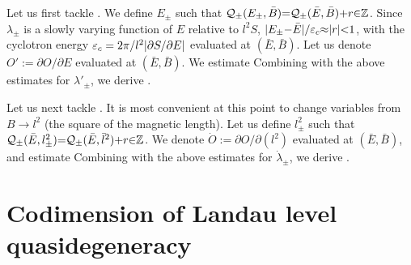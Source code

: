 \documentclass[aps, showpacs, twocolumn, notitlepage, superscriptaddress]{revtex4-1}
\begin{document}
Let us first tackle . We define $E_{\pm}$ such that ${\cal Q}_{\pm}(E_{\pm},\bar{B}){=}{\cal Q}_{\pm}(\bar{E},\bar{B}){+}r{\in} \mathbb{Z}$. Since  $\lambda_{\pm}$ is a slowly varying function of $E$ relative to $l^2S$, $|E_{\pm}{-}\bar{E}|/\varepsilon_c{\approx} |r|{<}1$, with the cyclotron energy $\varepsilon_c=2\pi/l^2|\partial S/\partial E|$ evaluated at $(\bar{E},\bar{B})$. Let us denote $O':=\partial O/\partial E$ evaluated at $(\bar{E},\bar{B})$. We estimate
Combining  with the above estimates for $\lambda'_{\pm}$, we derive .  

Let us next tackle . It is most convenient at this point to change variables from $B\rightarrow l^2$ (the square of the magnetic length). Let us  define   $l^2_{\pm}$ such that ${\cal Q}_{\pm}(\bar{E},l^2_{\pm}){=}{\cal Q}_{\pm}(\bar{E},\bar{l}^2){+}r{\in} \mathbb{Z}$. We denote  $\dot{O}:=\partial O/\partial(l^2)$ evaluated at $(\bar{E},\bar{B})$, and estimate
Combining  with the above estimates for $\dot{\lambda}_{\pm}$, we derive .


\section{Codimension of Landau level quasidegeneracy}\label{app:codimension}
\end{document}
